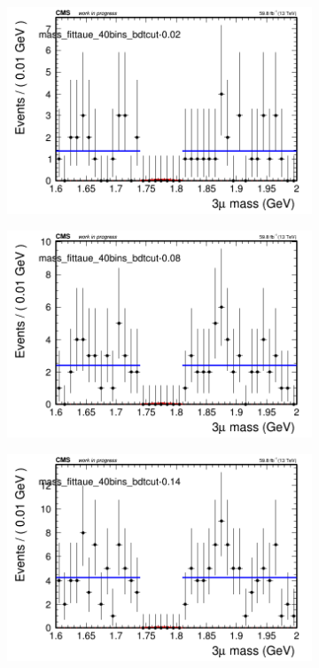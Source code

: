 \begin{figure}[H]
    \centering
    \begin{subfigure}{0.2\textwidth}
        \includegraphics[width=\textwidth]{flat_fit/plots/taue/massfit_taue_40bins_bdtcut-0.02.png}
        \caption{}
    \end{subfigure}
    \begin{subfigure}{0.2\textwidth}
        \includegraphics[width=\textwidth]{flat_fit/plots/taue/massfit_taue_40bins_bdtcut-0.08.png}
        \caption{}
    \end{subfigure}
    \begin{subfigure}{0.2\textwidth}
        \includegraphics[width=\textwidth]{flat_fit/plots/taue/massfit_taue_40bins_bdtcut-0.14.png}

\end{subfigure}
\end{figure}
